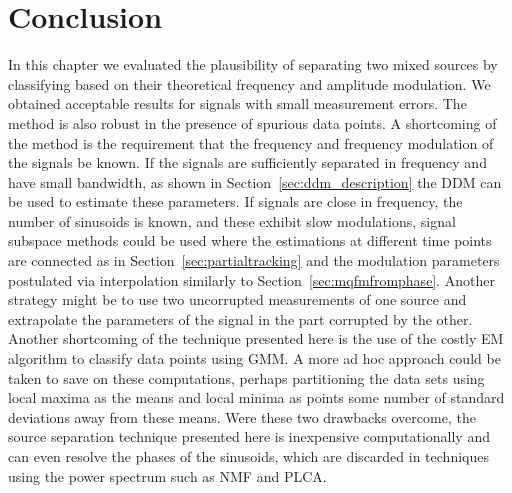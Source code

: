 \section{Conclusion}

In this chapter we evaluated the plausibility of separating two mixed sources
by classifying based on their theoretical frequency and amplitude modulation. We
obtained acceptable results for signals with small measurement errors. The
method is also robust in the presence of spurious data points. A shortcoming of
the method is the requirement that the frequency and frequency modulation of the
signals be known. If the signals are sufficiently separated in frequency and
have small bandwidth, as shown in Section~\ref{sec:ddm_description} the DDM can
be used to estimate these parameters. If signals are close in frequency, the
number of sinusoids is known, and these
exhibit slow modulations, signal subspace methods could be used \cite{} where
the estimations at different time points are connected as in
Section~\ref{sec:partialtracking} and the modulation parameters postulated via
interpolation similarly to Section~\ref{sec:mqfmfromphase}.
Another strategy might be to use two uncorrupted measurements of one source and
extrapolate the parameters of the signal in the part corrupted by the other.
Another shortcoming of the technique presented here is the use of the costly EM
algorithm to classify data points using GMM. A more ad hoc approach could be
taken to save on these computations, perhaps partitioning the data sets using
local maxima as the means and local minima as points some number of standard
deviations away from these means. Were these two drawbacks overcome, the source
separation technique presented here is inexpensive computationally and can even
resolve the phases of the sinusoids, which are discarded in techniques using the
power spectrum such as NMF and PLCA.

